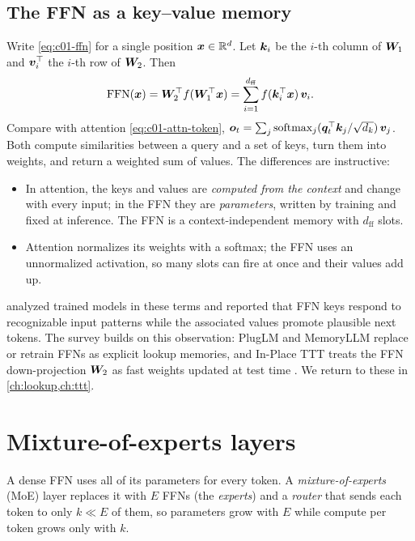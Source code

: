 \subsection{The FFN as a key--value memory}\label{sec:c01-ffn-memory}

Write \eqref{eq:c01-ffn} for a single position $\bm{x} \in \mathbb{R}^{d}$. Let $\bm{k}_i$ be the $i$-th
column of $\bm{W}_1$ and $\bm{v}_i^{\top}$ the $i$-th row of $\bm{W}_2$. Then
\begin{equation}\label{eq:c01-ffn-kv}
  \mathrm{FFN}(\bm{x}) = \bm{W}_2^{\top} f(\bm{W}_1^{\top}\bm{x}) = \sum_{i=1}^{d_{\mathrm{ff}}} f(\bm{k}_i^{\top}\bm{x})\,\bm{v}_i .
\end{equation}
Compare with attention \eqref{eq:c01-attn-token}, $\bm{o}_t = \sum_j
\operatorname{softmax}_j(\bm{q}_t^{\top}\bm{k}_j/\sqrt{d_k})\,\bm{v}_j$. Both compute similarities between a query and a
set of keys, turn them into weights, and return a weighted sum of values. The differences
are instructive:
\begin{itemize}
  \item In attention, the keys and values are \emph{computed from the context} and change
  with every input; in the FFN they are \emph{parameters}, written by training and fixed at
  inference. The FFN is a context-independent memory with $d_{\mathrm{ff}}$ slots.
  \item Attention normalizes its weights with a softmax; the FFN uses an unnormalized
  activation, so many slots can fire at once and their values add up.
\end{itemize}
\citet{c01-geva2021ffn} analyzed trained models in these terms and reported that FFN keys
respond to recognizable input patterns while the associated values promote plausible next
tokens. The survey builds on this observation: PlugLM and MemoryLLM replace or retrain FFNs
as explicit lookup memories, and In-Place TTT treats the FFN down-projection $\bm{W}_2$ as fast
weights updated at test time \citep{zhoubian2026memory}. We return to these in
\cref{ch:lookup,ch:ttt}.

\section{Mixture-of-experts layers}\label{sec:c01-moe}

A dense FFN uses all of its parameters for every token. A \emph{mixture-of-experts} (MoE)
layer \citep{c01-shazeer2017moe} replaces it with $E$ FFNs (the \emph{experts}) and a
\emph{router} that sends each token to only $k \ll E$ of them, so parameters grow with $E$
while compute per token grows only with $k$.

